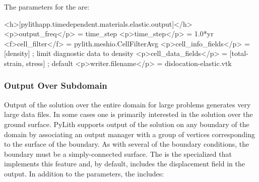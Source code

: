 The parameters for the  are:
\begin{inventory}
\end{inventory}

\begin{cfg}
<h>[pylithapp.timedependent.materials.elastic.output]</h>
<p>output_freq</p> = time_step
<p>time_step</p> = 1.0*yr
<f>cell_filter</f> = pylith.meshio.CellFilterAvg
<p>cell_info_fields</p> = [density] ; limit diagnostic data to density
<p>cell_data_fields</p> = [total-strain, stress] ; default
<p>writer.filename</p> = dislocation-elastic.vtk
\end{cfg}

\subsubsection{Output Over Subdomain}
\label{sec:output:subdomain}

Output of the solution over the entire domain for large problems generates
very large data files. In some cases one is primarily interested in
the solution over the ground surface. PyLith supports output of the
solution on any boundary of the domain by associating an output manager
with a group of vertices corresponding to the surface of the boundary.
As with several of the boundary conditions, the boundary must be a
simply-connected surface. The  is the specialized
 that implements this feature and, by default, includes
the displacement field in the output. In addition to the 
parameters, the  includes:
\begin{inventory}
\end{inventory}

